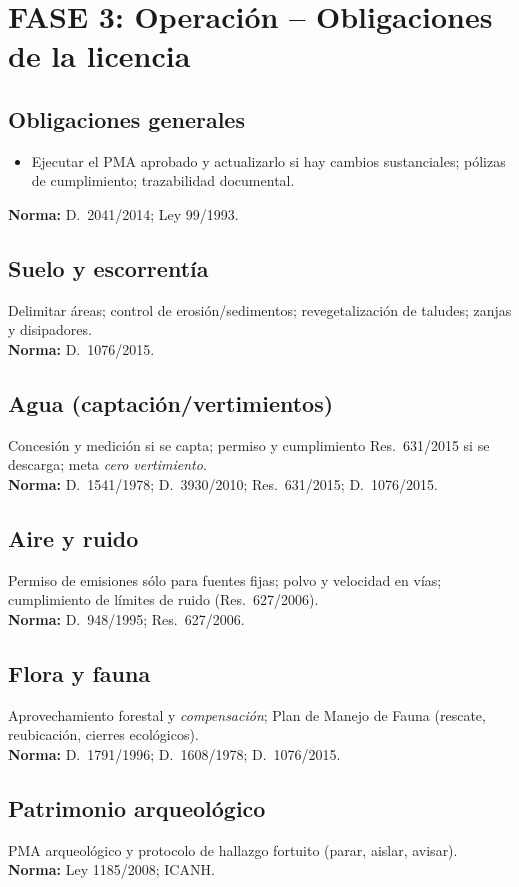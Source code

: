 \section{FASE 3: Operación -- Obligaciones de la licencia}
\subsection{Obligaciones generales}
\begin{itemize}
\item Ejecutar el PMA aprobado y actualizarlo si hay cambios sustanciales; pólizas de cumplimiento; trazabilidad documental.
\end{itemize}
\textbf{Norma:} D.\ 2041/2014; Ley 99/1993.

\subsection{Suelo y escorrentía}
Delimitar áreas; control de erosión/sedimentos; revegetalización de taludes; zanjas y disipadores.\\
\textbf{Norma:} D.\ 1076/2015.

\subsection{Agua (captación/vertimientos)}
Concesión y medición si se capta; permiso y cumplimiento Res.\ 631/2015 si se descarga; meta \textit{cero vertimiento}.\\
\textbf{Norma:} D.\ 1541/1978; D.\ 3930/2010; Res.\ 631/2015; D.\ 1076/2015.

\subsection{Aire y ruido}
Permiso de emisiones sólo para fuentes fijas; polvo y velocidad en vías; cumplimiento de límites de ruido (Res.\ 627/2006).\\
\textbf{Norma:} D.\ 948/1995; Res.\ 627/2006.

\subsection{Flora y fauna}
Aprovechamiento forestal y \textit{compensación}; Plan de Manejo de Fauna (rescate, reubicación, cierres ecológicos).\\
\textbf{Norma:} D.\ 1791/1996; D.\ 1608/1978; D.\ 1076/2015.

\subsection{Patrimonio arqueológico}
PMA arqueológico y protocolo de hallazgo fortuito (parar, aislar, avisar).\\
\textbf{Norma:} Ley 1185/2008; ICANH.

